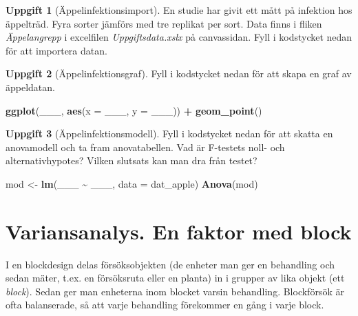 \documentclass[
]{book}
\newenvironment{Shaded}{\begin{snugshade}}{\end{snugshade}}
\newcommand{\AttributeTok}[1]{\textcolor[rgb]{0.13,0.29,0.53}{#1}}
\newcommand{\FunctionTok}[1]{\textcolor[rgb]{0.13,0.29,0.53}{\textbf{#1}}}
\newcommand{\NormalTok}[1]{#1}
\newcommand{\OtherTok}[1]{\textcolor[rgb]{0.56,0.35,0.01}{#1}}
\newcommand{\SpecialCharTok}[1]{\textcolor[rgb]{0.81,0.36,0.00}{\textbf{#1}}}
\theoremstyle{definition}
\theoremstyle{definition}
\theoremstyle{definition}
\newtheorem{exercise}{Uppgift}[chapter]
\theoremstyle{definition}
\theoremstyle{remark}
\begin{document}
\begin{exercise}[Äppelinfektionsimport]
En studie har givit ett mått på infektion hos äppelträd. Fyra sorter jämförs med tre replikat per sort. Data finns i fliken \emph{Äppelangrepp} i excelfilen \emph{Uppgiftsdata.xslx} på canvassidan. Fyll i kodstycket nedan för att importera datan.
\end{exercise}

\begin{exercise}[Äppelinfektionsgraf]

Fyll i kodstycket nedan för att skapa en graf av äppeldatan.

\begin{Shaded}
\begin{Highlighting}[]
\FunctionTok{ggplot}\NormalTok{(\_\_\_, }\FunctionTok{aes}\NormalTok{(}\AttributeTok{x =}\NormalTok{ \_\_\_, }\AttributeTok{y =}\NormalTok{ \_\_\_)) }\SpecialCharTok{+}
  \FunctionTok{geom\_point}\NormalTok{()}
\end{Highlighting}
\end{Shaded}

\end{exercise}

\begin{exercise}[Äppelinfektionsmodell]

Fyll i kodstycket nedan för att skatta en anovamodell och ta fram anovatabellen. Vad är F-testets noll- och alternativhypotes? Vilken slutsats kan man dra från testet?

\begin{Shaded}
\begin{Highlighting}[]
\NormalTok{mod }\OtherTok{\textless{}{-}} \FunctionTok{lm}\NormalTok{(\_\_\_ }\SpecialCharTok{\textasciitilde{}}\NormalTok{ \_\_\_, }\AttributeTok{data =}\NormalTok{ dat\_apple)}
\FunctionTok{Anova}\NormalTok{(mod)}
\end{Highlighting}
\end{Shaded}

\end{exercise}

\section{Variansanalys. En faktor med block}\label{variansanalys.-en-faktor-med-block}

I en blockdesign delas försöksobjekten (de enheter man ger en behandling och sedan mäter, t.ex. en försöksruta eller en planta) in i grupper av lika objekt (ett \emph{block}). Sedan ger man enheterna inom blocket varsin behandling. Blockförsök är ofta balanserade, så att varje behandling förekommer en gång i varje block.
\end{document}
